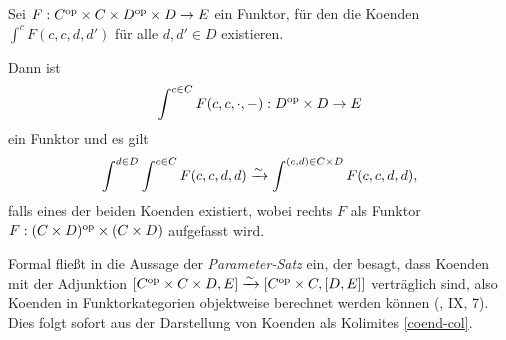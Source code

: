 \begin{lemma}
  \label{coend-fubini}
  Sei $F: C^\mathrm{op} \times C \times D^\mathrm{op} \times D \to E$ ein Funktor, für
  den die Koenden $\int^c F(c, c, d, d')$ für alle $d, d' \in D$
  existieren.

  Dann ist
  \[ \int^{c \in C} F(c, c, \cdot, -): D^\mathrm{op} \times D \to E \]
  ein Funktor und es gilt
  \[ \int^{d \in D} \int^{c \in C} F(c, c, d, d)
  \xrightarrow[]{\sim} \int^{(c, d) \in C \times D} F(c, c, d, d),
  \]
  falls eines der beiden Koenden existiert, wobei rechts $F$ als
  Funktor $F: (C \times D)^\mathrm{op} \times (C \times D)$ aufgefasst wird.
\end{lemma}
\begin{bem}
  Formal fließt in die Aussage der \emph{Parameter-Satz} ein, der
  besagt, dass Koenden mit der Adjunktion $[C^\mathrm{op} \times C \times D, E]
  \xrightarrow[]{\sim} {[C^\mathrm{op} \times C, [D, E]]}$ verträglich sind, also Koenden in
  Funktorkategorien objektweise berechnet werden können (\cite{ML},
  IX, 7). Dies folgt sofort aus der Darstellung von Koenden als
  Kolimites \ref{coend-col}.
\end{bem}
